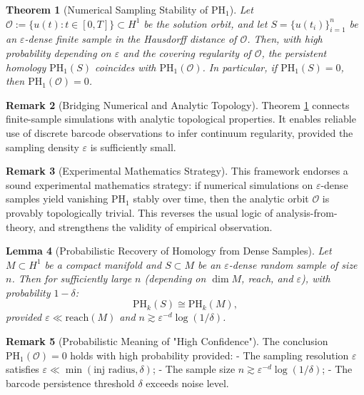 \documentclass[11pt]{article}
\newtheorem{theorem}{Theorem}[section]
\newtheorem{lemma}[theorem]{Lemma}
\theoremstyle{definition}
\newtheorem{remark}[theorem]{Remark}
\begin{document}
\begin{theorem}[Numerical Sampling Stability of $\mathrm{PH}_1$]
\label{thm:niyogi_smale_weinberger}
Let $\mathcal{O} := \{u(t): t \in [0,T]\} \subset H^1$ be the solution orbit, and let $S = \{u(t_i)\}_{i=1}^n$ be an $\varepsilon$-dense finite sample in the Hausdorff distance of $\mathcal{O}$. Then, with high probability depending on $\varepsilon$ and the covering regularity of $\mathcal{O}$, the persistent homology $\mathrm{PH}_1(S)$ coincides with $\mathrm{PH}_1(\mathcal{O})$. In particular, if $\mathrm{PH}_1(S) = 0$, then $\mathrm{PH}_1(\mathcal{O}) = 0$.
\end{theorem}

\begin{remark}[Bridging Numerical and Analytic Topology]
Theorem \ref{thm:niyogi_smale_weinberger} connects finite-sample simulations with analytic topological properties. It enables reliable use of discrete barcode observations to infer continuum regularity, provided the sampling density $\varepsilon$ is sufficiently small.
\end{remark}

\begin{remark}[Experimental Mathematics Strategy]
This framework endorses a sound experimental mathematics strategy: if numerical simulations on $\varepsilon$-dense samples yield vanishing $\mathrm{PH}_1$ stably over time, then the analytic orbit $\mathcal{O}$ is provably topologically trivial. This reverses the usual logic of analysis-from-theory, and strengthens the validity of empirical observation.
\end{remark}

\begin{lemma}[Probabilistic Recovery of Homology from Dense Samples]
Let $M \subset H^1$ be a compact manifold and $S \subset M$ be an $\varepsilon$-dense random sample of size $n$. Then for sufficiently large $n$ (depending on $\dim M$, reach, and $\varepsilon$), with probability $1 - \delta$:
\[
\mathrm{PH}_k(S) \cong \mathrm{PH}_k(M),
\]
provided $\varepsilon \ll \text{reach}(M)$ and $n \gtrsim \varepsilon^{-d} \log(1/\delta)$.
\end{lemma}

\begin{remark}[Probabilistic Meaning of "High Confidence"]
The conclusion $\mathrm{PH}_1(\mathcal{O}) = 0$ holds with high probability provided:
- The sampling resolution $\varepsilon$ satisfies $\varepsilon \ll \min(\text{inj radius}, \delta)$;
- The sample size $n \gtrsim \varepsilon^{-d} \log(1/\delta)$;
- The barcode persistence threshold $\delta$ exceeds noise level.
\end{remark}
\end{document}
